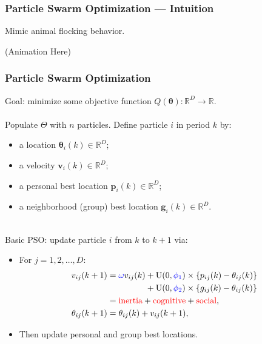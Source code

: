 \documentclass[xcolor=dvipsnames]{beamer}
\begin{document}
\begin{frame}
\frametitle{Particle Swarm Optimization --- Intuition}
Mimic animal flocking behavior.

(Animation Here)

\end{frame}

\begin{frame}
\frametitle{Particle Swarm Optimization}
Goal: minimize some objective function $Q(\bm{\theta}): \mathbb{R}^D \to \mathbb{R}$.\\~\\
Populate $\Theta$ with $n$ particles. Define particle $i$ in period $k$ by:
\begin{itemize}
\item a {\color{red}location} \hfill $\bm{\theta}_i(k)\in \mathbb{R}^D$;\hspace{2.5cm}\phantom{.}
\item a {\color{red}velocity} \hfill $\bm{v}_i(k) \in \mathbb{R}^D$;\hspace{2.5cm}\phantom{.}
\item a {\color{red}personal best} location \hfill $\bm{p}_i(k) \in \mathbb{R}^D$;\hspace{2.5cm}\phantom{.} 
\item a {\color{red}neighborhood (group) best} location \hfill $\bm{g}_i(k) \in \mathbb{R}^D$.\hspace{2.5cm}\phantom{.} \\~\\
\end{itemize}

\pause 

Basic PSO: update particle $i$ from $k$ to $k+1$ via: \\
\begin{itemize}
\item  For $j=1,2,\dots,D$:
\begin{align*}
v_{ij}(k+1) &= {\color{blue}\omega} v_{ij}(k) +  \mathrm{U}(0,{\color{blue}\phi_1})\times\{p_{ij}(k) - \theta_{ij}(k)\} \\
     &\;\phantom{= \omega v_{ij}(k)}+  \mathrm{U}(0,{\color{blue}\phi_2})\times\{g_{ij}(k) - \theta_{ij}(k)\}\\
& = \mbox{{\color{red}inertia}} + \mbox{{\color{red}cognitive}} + \mbox{{\color{red}social}},\\
\theta_{ij}(k+1) &= \theta_{ij}(k) + v_{ij}(k+1),
\end{align*}
\item Then update personal and group best locations.
\end{itemize}
\end{frame}
\end{document}
